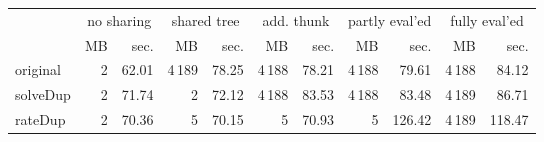 \makeatletter
\begin{tabular}{lrrrrrrrrrr}
 \\
& \multicolumn{2}{c}{no sharing}& \multicolumn{2}{c}{shared tree}& \multicolumn{2}{c}{add. thunk}& \multicolumn{2}{c}{partly eval'ed}& \multicolumn{2}{c}{fully eval'ed} \\
& MB & sec.& MB & sec.& MB & sec.& MB & sec.& MB & sec. \\ \midrule 
original& {\def\@currentlabel{2}\label{stats:slow:Original:Unshared:mem}2} & {\def\@currentlabel{62.01}\label{stats:slow:Original:Unshared:time}62.01}& {\def\@currentlabel{4\,189}\label{stats:slow:Original:Shared:mem}4\,189} & {\def\@currentlabel{78.25}\label{stats:slow:Original:Shared:time}78.25}& {\def\@currentlabel{4\,188}\label{stats:slow:Original:SharedThunk:mem}4\,188} & {\def\@currentlabel{78.21}\label{stats:slow:Original:SharedThunk:time}78.21}& {\def\@currentlabel{4\,188}\label{stats:slow:Original:SharedEvaled:mem}4\,188} & {\def\@currentlabel{79.61}\label{stats:slow:Original:SharedEvaled:time}79.61}& {\def\@currentlabel{4\,188}\label{stats:slow:Original:SharedFull:mem}4\,188} & {\def\@currentlabel{84.12}\label{stats:slow:Original:SharedFull:time}84.12} \\
\textsf{solveDup}& {\def\@currentlabel{2}\label{stats:slow:SolveDup:Unshared:mem}2} & {\def\@currentlabel{71.74}\label{stats:slow:SolveDup:Unshared:time}71.74}& {\def\@currentlabel{2}\label{stats:slow:SolveDup:Shared:mem}2} & {\def\@currentlabel{72.12}\label{stats:slow:SolveDup:Shared:time}72.12}& {\def\@currentlabel{4\,188}\label{stats:slow:SolveDup:SharedThunk:mem}4\,188} & {\def\@currentlabel{83.53}\label{stats:slow:SolveDup:SharedThunk:time}83.53}& {\def\@currentlabel{4\,188}\label{stats:slow:SolveDup:SharedEvaled:mem}4\,188} & {\def\@currentlabel{83.48}\label{stats:slow:SolveDup:SharedEvaled:time}83.48}& {\def\@currentlabel{4\,189}\label{stats:slow:SolveDup:SharedFull:mem}4\,189} & {\def\@currentlabel{86.71}\label{stats:slow:SolveDup:SharedFull:time}86.71} \\
\textsf{rateDup}& {\def\@currentlabel{2}\label{stats:slow:RateDup:Unshared:mem}2} & {\def\@currentlabel{70.36}\label{stats:slow:RateDup:Unshared:time}70.36}& {\def\@currentlabel{5}\label{stats:slow:RateDup:Shared:mem}5} & {\def\@currentlabel{70.15}\label{stats:slow:RateDup:Shared:time}70.15}& {\def\@currentlabel{5}\label{stats:slow:RateDup:SharedThunk:mem}5} & {\def\@currentlabel{70.93}\label{stats:slow:RateDup:SharedThunk:time}70.93}& {\def\@currentlabel{5}\label{stats:slow:RateDup:SharedEvaled:mem}5} & {\def\@currentlabel{126.42}\label{stats:slow:RateDup:SharedEvaled:time}126.42}& {\def\@currentlabel{4\,189}\label{stats:slow:RateDup:SharedFull:mem}4\,189} & {\def\@currentlabel{118.47}\label{stats:slow:RateDup:SharedFull:time}118.47} \\

\end{tabular}
